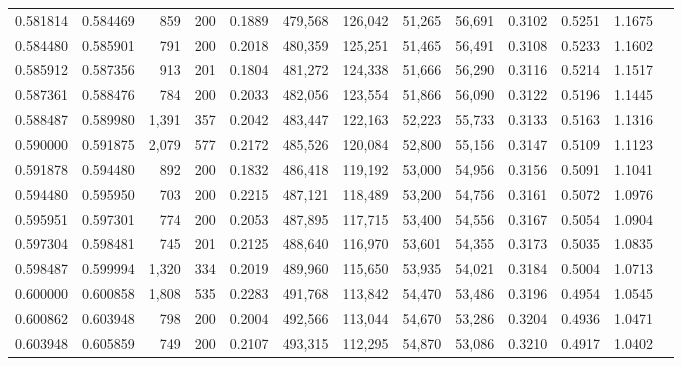 \begin{tabular}{rrrrrrrrrrrrr}
0.581814 & 0.584469 &   859 & 200 &                                     0.1889 & 479,568 & 126,042 &  51,265 &  56,691 & 0.3102 & 0.5251 & 1.1675 \\
0.584480 & 0.585901 &   791 & 200 &                                     0.2018 & 480,359 & 125,251 &  51,465 &  56,491 & 0.3108 & 0.5233 & 1.1602 \\
0.585912 & 0.587356 &   913 & 201 &                                     0.1804 & 481,272 & 124,338 &  51,666 &  56,290 & 0.3116 & 0.5214 & 1.1517 \\
0.587361 & 0.588476 &   784 & 200 &                                     0.2033 & 482,056 & 123,554 &  51,866 &  56,090 & 0.3122 & 0.5196 & 1.1445 \\
0.588487 & 0.589980 & 1,391 & 357 &                                     0.2042 & 483,447 & 122,163 &  52,223 &  55,733 & 0.3133 & 0.5163 & 1.1316 \\
0.590000 & 0.591875 & 2,079 & 577 &                                     0.2172 & 485,526 & 120,084 &  52,800 &  55,156 & 0.3147 & 0.5109 & 1.1123 \\
0.591878 & 0.594480 &   892 & 200 &                                     0.1832 & 486,418 & 119,192 &  53,000 &  54,956 & 0.3156 & 0.5091 & 1.1041 \\
0.594480 & 0.595950 &   703 & 200 &                                     0.2215 & 487,121 & 118,489 &  53,200 &  54,756 & 0.3161 & 0.5072 & 1.0976 \\
0.595951 & 0.597301 &   774 & 200 &                                     0.2053 & 487,895 & 117,715 &  53,400 &  54,556 & 0.3167 & 0.5054 & 1.0904 \\
0.597304 & 0.598481 &   745 & 201 &                                     0.2125 & 488,640 & 116,970 &  53,601 &  54,355 & 0.3173 & 0.5035 & 1.0835 \\
0.598487 & 0.599994 & 1,320 & 334 &                                     0.2019 & 489,960 & 115,650 &  53,935 &  54,021 & 0.3184 & 0.5004 & 1.0713 \\
0.600000 & 0.600858 & 1,808 & 535 &                                     0.2283 & 491,768 & 113,842 &  54,470 &  53,486 & 0.3196 & 0.4954 & 1.0545 \\
0.600862 & 0.603948 &   798 & 200 &                                     0.2004 & 492,566 & 113,044 &  54,670 &  53,286 & 0.3204 & 0.4936 & 1.0471 \\
0.603948 & 0.605859 &   749 & 200 &                                     0.2107 & 493,315 & 112,295 &  54,870 &  53,086 & 0.3210 & 0.4917 & 1.0402 \\

\end{tabular}
